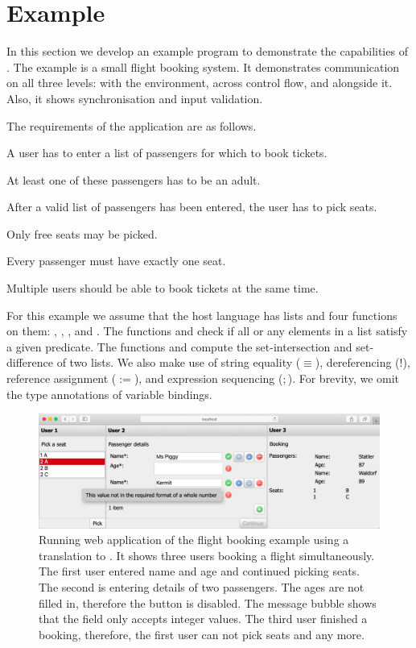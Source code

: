 


\section{Example}
\label{sec:example}

In this section we develop an example program to demonstrate the capabilities of \TOPHAT.
The example is a small flight booking system.
It demonstrates communication on all three levels: with the environment, across control flow, and alongside it.
Also, it shows synchronisation and input validation.

The requirements of the application are as follows.
\begin{enumerate*}
  \item A user has to enter a list of passengers for which to book tickets.
  \item At least one of these passengers has to be an adult.
  \item After a valid list of passengers has been entered, the user has to pick seats.
  \item Only free seats may be picked.
  \item Every passenger must have exactly one seat.
  \item Multiple users should be able to book tickets at the same time.
\end{enumerate*}

For this example we assume that the host language has lists and four functions on them: , , , and .
The functions  and  check if all or any elements in a list satisfy a given predicate.
The functions  and  compute the set-intersection and set-difference of two lists.
We also make use of string equality ($\equiv$), dereferencing ($!$), reference assignment ($:=$), and expression sequencing ($;$).
For brevity, we omit the type annotations of variable bindings.


\begin{figure}[b]
  \includegraphics[width=0.8\columnwidth]{figures/flight-booking.png}
  \caption{
    Running web application of the flight booking example using a translation to \ITASKS.
    It shows three users booking a flight simultaneously.
    The first user entered name and age and continued picking seats.
    The second is entering details of two passengers.
    The ages are not filled in, therefore the  button is disabled.
    The message bubble shows that the  field only accepts integer values.
    The third user finished a booking,
    therefore, the first user can not pick seats  and  any more.
  }
  \label{fig:flight-booking}
\end{figure}



